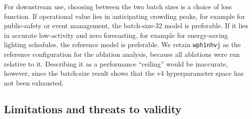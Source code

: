 For downstream use, choosing between the two batch sizes is a choice of
loss function. If operational value lies in anticipating crowding peaks,
for example for public-safety or event management, the batch-size-32
model is preferable. If it lies in accurate low-activity and zero
forecasting, for example for energy-saving lighting schedules, the
reference model is preferable. We retain \texttt{wph1nhvj} as the
reference configuration for the ablation analysis, because all
ablations were run relative to it. Describing it as a performance
``ceiling'' would be inaccurate, however, since the batch-size result
shows that the v4 hyperparameter space has not been exhausted.

\subsection{Limitations and threats to validity}
\label{sec:exp3-limitations}

